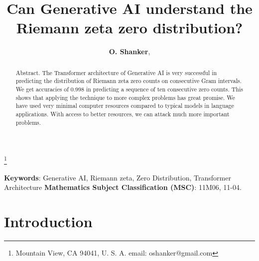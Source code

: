 \documentclass[twoside]{article}
\begin{document}


\newtheorem{theorem}{Theorem}[section]
\newtheorem{lemma}[theorem]{Lemma}

\theoremstyle{definition}
\newtheorem{definition}[theorem]{Definition}
\newtheorem{example}[theorem]{Example}
\newtheorem{xca}[theorem]{Exercise}

\theoremstyle{remark}
\newtheorem{remark}[theorem]{Remark}



\date{}
\lhead[]{}
\rhead[]{}

\title{\bf{Can Generative AI understand the Riemann zeta zero distribution?}}

\maketitle


\author{{\textbf{O. Shanker}},}
\thanks{ Mountain View, CA 94041, U. S. A. email: oshanker@gmail.com}

\thispagestyle{fancy}

\begin{abstract}
Abstract. 
The Transformer architecture of Generative AI is very successful in predicting the distribution of Riemann zeta zero counts on consecutive Gram intervals. We get accuracies of 0.998
in predicting a sequence of ten consecutive zero counts. This shows that applying the technique to more complex problems has great promise. We have used very minimal computer resources compared to typical models in language applications. With access to better resources, we can attack much more important problems.

\end{abstract}
{\textbf {Keywords}:} Generative AI, Riemann zeta, Zero Distribution,  Transformer Architecture 
{\textbf {Mathematics Subject Classification (MSC)}:} 11M06, 11-04.


\symbolfootnote[0]{*}


\section{Introduction}
\end{document}
